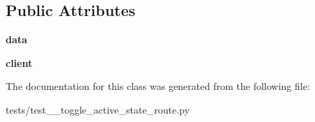 \subsection*{Public Attributes}
\begin{DoxyCompactItemize}
\item 
\mbox{\label{classtests_1_1test__8__toggle__active__state__route_1_1_test_user_routes_afb4f6e3670d24b5ba5e3e468b612b94c}} 
{\bfseries data}
\item 
\mbox{\label{classtests_1_1test__8__toggle__active__state__route_1_1_test_user_routes_adef395112c8f0ae07aeaf02e591dae38}} 
{\bfseries client}
\end{DoxyCompactItemize}


The documentation for this class was generated from the following file\+:\begin{DoxyCompactItemize}
\item 
tests/test\+\_\+\_\+toggle\+\_\+active\+\_\+state\+\_\+route.\+py\end{DoxyCompactItemize}
